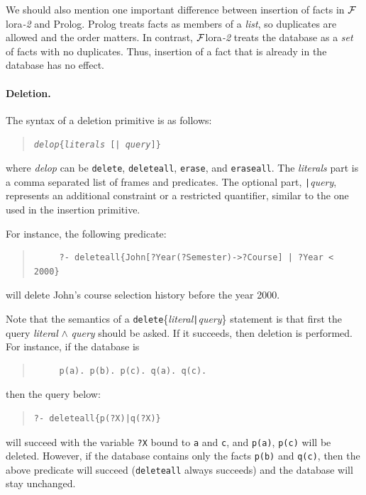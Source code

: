 \documentclass[11pt]{article}
\newcommand{\FLORA}{{\mbox{\sc ${\cal F}${lora}\rm\emph{-2}}}\xspace}
\newcommand{\FLSYSTEM}{\FLORA}
\begin{document}
We should also mention one important difference between insertion of facts
in \FLSYSTEM and Prolog. Prolog treats facts as members of a \emph{list}, so
duplicates are allowed and the order matters. In contrast, \FLSYSTEM treats
the database as a \emph{set} of facts with no duplicates. Thus, insertion
of a fact that is already in the database has no effect.


%
\paragraph{Deletion.} The syntax of a deletion primitive is as follows:
\begin{quote}
{\tt \emph{delop}\{\emph{literals} [| \emph{query}]\}}
\end{quote}
where {\it delop} can be {\tt delete}, {\tt deleteall}, {\tt erase}, and
{\tt eraseall}. The {\it literals} part is a comma separated list of
frames and predicates. The optional part, {\tt |}\emph{query},
represents an additional constraint or a restricted quantifier, similar
to the one used in the insertion primitive.

For instance, the following predicate:
\begin{quote}
\begin{verbatim}
     ?- deleteall{John[?Year(?Semester)->?Course] | ?Year < 2000}
\end{verbatim}
\end{quote}
will delete John's course selection history before the year 2000.

Note that the semantics of a {\tt delete}\{\emph{literal}{\tt |}{\it query}\}
statement is that first the query \emph{literal} $\wedge$ \emph{query} should
be asked. If it succeeds, then deletion is performed. For instance, if the
database is
\begin{quote}
\begin{verbatim}
     p(a). p(b). p(c). q(a). q(c).
\end{verbatim}
\end{quote}
then the query below:
\begin{quote}
\begin{verbatim}
?- deleteall{p(?X)|q(?X)}
\end{verbatim}
\end{quote}
will succeed with the variable {\tt ?X} bound to {\tt a} and {\tt c}, and
{\tt p(a)}, {\tt p(c)} will be deleted.  However, if the database contains
only the facts {\tt p(b)} and {\tt q(c)}, then the above predicate will
succeed ({\tt deleteall} always succeeds) and the database will stay
unchanged.
\end{document}
